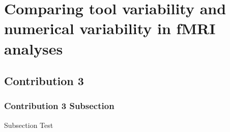 \chapter{Comparing tool variability and numerical variability in fMRI analyses}
\label{ch:c3}

\section{Contribution 3}
\subsection{Contribution 3 Subsection}
Subsection Test
